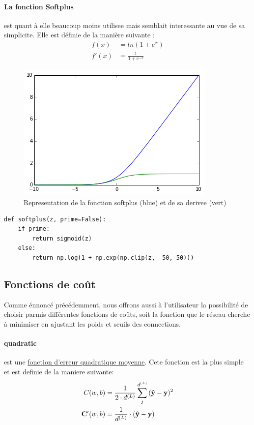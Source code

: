 \documentclass[11pt]{article}
\begin{document}
\paragraph{La fonction Softplus} est quant \`a elle beaucoup moins utilisee mais
semblait interessante au vue de sa simplicite. Elle est d\'efinie de la mani\`ere
suivante :
\begin{equation}
	\begin{aligned}
		f(x)  &= ln(1+e^x) \\
		f'(x) &= \frac{1}{1+e^{-x}}
	\end{aligned}
\end{equation}
\begin{figure}[htp]
	\centering
	\includegraphics[scale=.5]{img/act_softplus.png}
	\caption{Representation de la fonction softplus (blue) et de sa derivee (vert)}
\end{figure}
\begin{lstlisting}
def softplus(z, prime=False):
	if prime:
		return sigmoid(z)
	else:
		return np.log(1 + np.exp(np.clip(z, -50, 50)))
\end{lstlisting}


\newpage
\subsection{Fonctions de co\^ut}\label{cost}
Comme \'ennonc\'e pr\'ec\'edemment, nous offrons aussi \`a l'utilisateur la
possibilit\'e de choisir parmis diff\'erentes fonctions de co\^uts, soit la fonction
que le r\'eseau cherche \`a minimiser en ajustant les poids et seuils des connections.
\paragraph{quadratic} est une
\href{https://fr.wikipedia.org/wiki/Erreur_quadratique_moyenne}
{fonction d'erreur quadratique moyenne}. Cete fonction est la plus simple et
est definie de la maniere suivante:
\begin{equation}
	\begin{aligned}
		C(w, b) &= \frac{1}{2\cdot d^{(L)}}\sum_{j}^{d^{(L)}}{({\bf\hat y} - {\bf y})^2}  \\
		{\bf C'}(w, b) &= \frac{1}{d^{(L)}}\cdot({\bf\hat y} - {\bf y})
	\end{aligned}
\end{equation}
\end{document}

